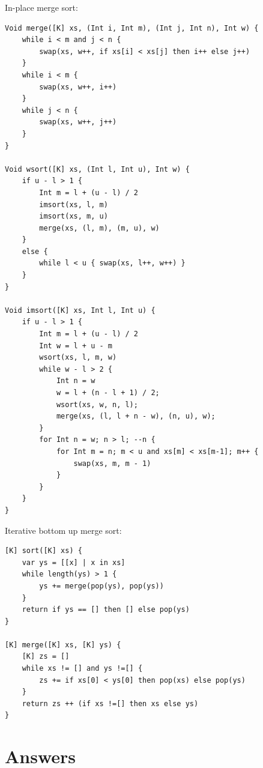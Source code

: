\documentclass[b5paper]{article}
\begin{document}
In-place merge sort:

\begin{lstlisting}[language = Bourbaki]
Void merge([K] xs, (Int i, Int m), (Int j, Int n), Int w) {
    while i < m and j < n {
        swap(xs, w++, if xs[i] < xs[j] then i++ else j++)
    }
    while i < m {
        swap(xs, w++, i++)
    }
    while j < n {
        swap(xs, w++, j++)
    }
}

Void wsort([K] xs, (Int l, Int u), Int w) {
    if u - l > 1 {
        Int m = l + (u - l) / 2
        imsort(xs, l, m)
        imsort(xs, m, u)
        merge(xs, (l, m), (m, u), w)
    }
    else {
        while l < u { swap(xs, l++, w++) }
    }
}

Void imsort([K] xs, Int l, Int u) {
    if u - l > 1 {
        Int m = l + (u - l) / 2
        Int w = l + u - m
        wsort(xs, l, m, w)
        while w - l > 2 {
            Int n = w
            w = l + (n - l + 1) / 2;
            wsort(xs, w, n, l);
            merge(xs, (l, l + n - w), (n, u), w);
        }
        for Int n = w; n > l; --n {
            for Int m = n; m < u and xs[m] < xs[m-1]; m++ {
                swap(xs, m, m - 1)
            }
        }
    }
}
\end{lstlisting}

Iterative bottom up merge sort:

\begin{lstlisting}[language = Bourbaki]
[K] sort([K] xs) {
    var ys = [[x] | x in xs]
    while length(ys) > 1 {
        ys += merge(pop(ys), pop(ys))
    }
    return if ys == [] then [] else pop(ys)
}

[K] merge([K] xs, [K] ys) {
    [K] zs = []
    while xs != [] and ys !=[] {
        zs += if xs[0] < ys[0] then pop(xs) else pop(ys)
    }
    return zs ++ (if xs !=[] then xs else ys)
}
\end{lstlisting}

\ifx\wholebook\relax\else
\section{Answers}
\shipoutAnswer
\end{document}
